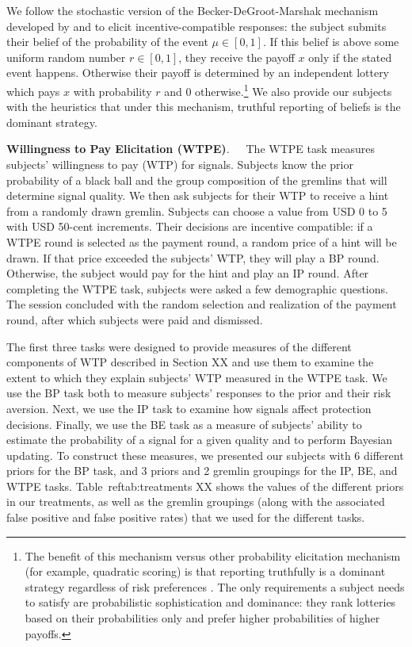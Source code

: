 \documentclass[12pt,a4paper]{article}
\begin{document}
We follow the stochastic version of the Becker-DeGroot-Marshak mechanism developed by \citet{grether_testing_1992} and \citet{holt_update_2009} to elicit incentive-compatible responses: the subject submits their belief of the probability of the event $\mu \in [0,1]$. If this belief is above some uniform random number $r\in[0,1]$, they receive the payoff $x$ only if the stated event happens. Otherwise their payoff is determined by an independent lottery which pays $x$ with probability $r$ and 0 otherwise.\footnote{The benefit of this mechanism versus other probability elicitation mechanism (for example, quadratic scoring) is that reporting truthfully is a dominant strategy regardless of risk preferences \citep{karni_mechanism_2009-1}. The only requirements a subject needs to satisfy are probabilistic sophistication and dominance: they rank lotteries based on their probabilities only and prefer higher probabilities of higher payoffs.} We also provide our subjects with the heuristics that under this mechanism, truthful reporting of beliefs is the dominant strategy.

\bigskip
\noindent\textbf{Willingness to Pay Elicitation (WTPE)}.\ \ \ The WTPE task measures subjects' willingness to pay (WTP) for signals. Subjects know the prior probability of a black ball and the group composition of the gremlins that will determine signal quality.  We then ask subjects for their WTP to receive a hint from a randomly drawn gremlin. Subjects can choose a value from USD 0 to 5 with USD 50-cent increments. Their decisions are incentive compatible: if a WTPE round is selected as the payment round, a random price of a hint will be drawn. If that price exceeded the subjects' WTP, they will play a BP round. Otherwise, the subject would pay for the hint and play an IP round.  After completing the WTPE task, subjects were asked a few demographic questions. The session concluded with the random selection and realization of the payment round, after which subjects were paid and dismissed.

The first three tasks were designed to provide measures of the different components of WTP described in Section XX and use them to examine the extent to which they explain subjects' WTP measured in the WTPE task. We use the BP task both to measure subjects' responses to the prior and their risk aversion. Next, we use the IP task to examine how signals affect protection decisions. Finally, we use the BE task as a measure of subjects' ability to estimate the probability of a signal for a given quality and to perform Bayesian updating. To construct these measures, we presented our subjects with 6 different priors for the BP task, and 3 priors and 2 gremlin groupings for the IP, BE, and WTPE tasks. Table~ref{tab:treatments} XX shows the values of the different priors in our treatments, as well as the gremlin groupings (along with the associated false positive and false positive rates) that we used for the different tasks.
\end{document}
